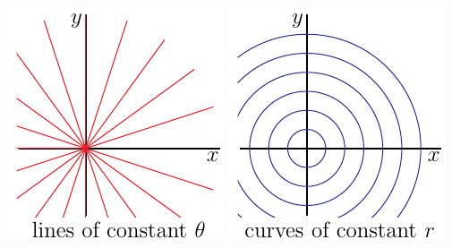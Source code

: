 \begin{efig}
\begin{center}
    \includegraphics{polarTh.pdf}\qquad\qquad
    \includegraphics{polarR.pdf}
\end{center}
\end{efig}


